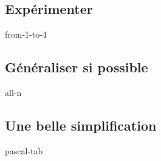 \subsection{Expérimenter}

{from-1-to-4}



\subsection{Généraliser si possible}

{all-n}



\subsection{Une belle simplification}

{pascal-tab}